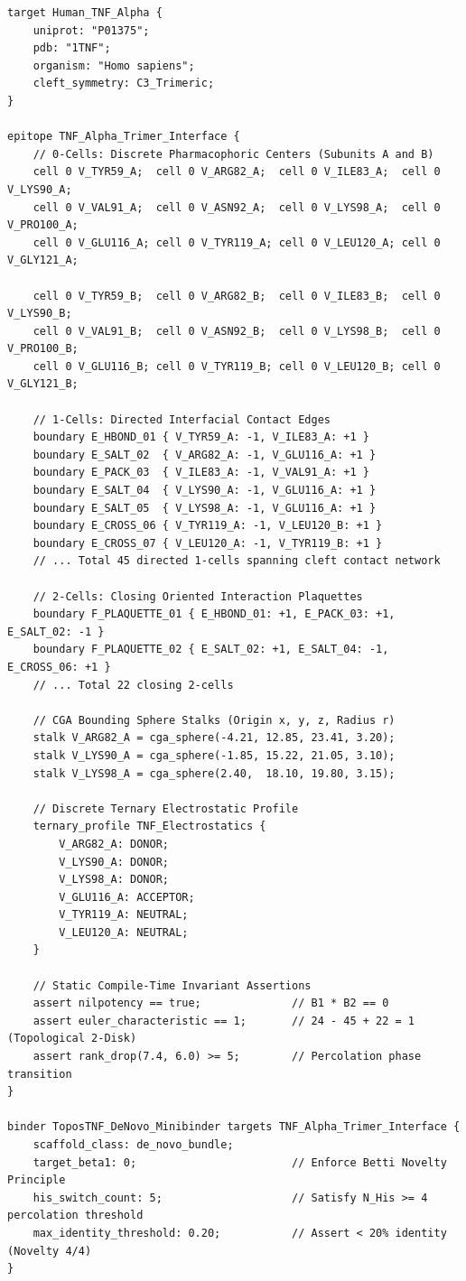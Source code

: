 \begin{lstlisting}[style=toposstyle, caption={ToposLang Cellular Contract for the Human TNF-$\alpha$ Trimer Interface.}]
target Human_TNF_Alpha {
    uniprot: "P01375";
    pdb: "1TNF";
    organism: "Homo sapiens";
    cleft_symmetry: C3_Trimeric;
}

epitope TNF_Alpha_Trimer_Interface {
    // 0-Cells: Discrete Pharmacophoric Centers (Subunits A and B)
    cell 0 V_TYR59_A;  cell 0 V_ARG82_A;  cell 0 V_ILE83_A;  cell 0 V_LYS90_A;
    cell 0 V_VAL91_A;  cell 0 V_ASN92_A;  cell 0 V_LYS98_A;  cell 0 V_PRO100_A;
    cell 0 V_GLU116_A; cell 0 V_TYR119_A; cell 0 V_LEU120_A; cell 0 V_GLY121_A;
    
    cell 0 V_TYR59_B;  cell 0 V_ARG82_B;  cell 0 V_ILE83_B;  cell 0 V_LYS90_B;
    cell 0 V_VAL91_B;  cell 0 V_ASN92_B;  cell 0 V_LYS98_B;  cell 0 V_PRO100_B;
    cell 0 V_GLU116_B; cell 0 V_TYR119_B; cell 0 V_LEU120_B; cell 0 V_GLY121_B;

    // 1-Cells: Directed Interfacial Contact Edges
    boundary E_HBOND_01 { V_TYR59_A: -1, V_ILE83_A: +1 }
    boundary E_SALT_02  { V_ARG82_A: -1, V_GLU116_A: +1 }
    boundary E_PACK_03  { V_ILE83_A: -1, V_VAL91_A: +1 }
    boundary E_SALT_04  { V_LYS90_A: -1, V_GLU116_A: +1 }
    boundary E_SALT_05  { V_LYS98_A: -1, V_GLU116_A: +1 }
    boundary E_CROSS_06 { V_TYR119_A: -1, V_LEU120_B: +1 }
    boundary E_CROSS_07 { V_LEU120_A: -1, V_TYR119_B: +1 }
    // ... Total 45 directed 1-cells spanning cleft contact network

    // 2-Cells: Closing Oriented Interaction Plaquettes
    boundary F_PLAQUETTE_01 { E_HBOND_01: +1, E_PACK_03: +1, E_SALT_02: -1 }
    boundary F_PLAQUETTE_02 { E_SALT_02: +1, E_SALT_04: -1, E_CROSS_06: +1 }
    // ... Total 22 closing 2-cells

    // CGA Bounding Sphere Stalks (Origin x, y, z, Radius r)
    stalk V_ARG82_A = cga_sphere(-4.21, 12.85, 23.41, 3.20);
    stalk V_LYS90_A = cga_sphere(-1.85, 15.22, 21.05, 3.10);
    stalk V_LYS98_A = cga_sphere(2.40,  18.10, 19.80, 3.15);

    // Discrete Ternary Electrostatic Profile
    ternary_profile TNF_Electrostatics {
        V_ARG82_A: DONOR;
        V_LYS90_A: DONOR;
        V_LYS98_A: DONOR;
        V_GLU116_A: ACCEPTOR;
        V_TYR119_A: NEUTRAL;
        V_LEU120_A: NEUTRAL;
    }

    // Static Compile-Time Invariant Assertions
    assert nilpotency == true;              // B1 * B2 == 0
    assert euler_characteristic == 1;       // 24 - 45 + 22 = 1 (Topological 2-Disk)
    assert rank_drop(7.4, 6.0) >= 5;        // Percolation phase transition
}

binder ToposTNF_DeNovo_Minibinder targets TNF_Alpha_Trimer_Interface {
    scaffold_class: de_novo_bundle;
    target_beta1: 0;                        // Enforce Betti Novelty Principle
    his_switch_count: 5;                    // Satisfy N_His >= 4 percolation threshold
    max_identity_threshold: 0.20;           // Assert < 20% identity (Novelty 4/4)
}
\end{lstlisting}

